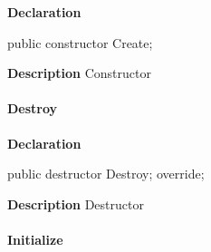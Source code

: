 \documentclass{report}
\newif\ifpdf
\begin{document}
\label{ipkhandle.TInstallation-Create}
\begin{list}{}{
\setlength{\itemindent}{0cm}
\setlength{\listparindent}{0cm}
\setlength{\leftmargin}{\evensidemargin}
\addtolength{\leftmargin}{\tmplength}
\settowidth{\labelsep}{X}
\addtolength{\leftmargin}{\labelsep}
\setlength{\labelwidth}{\tmplength}
}
\item[\textbf{Declaration}\hfill]
\ifpdf
\begin{flushleft}
\fi
\begin{ttfamily}
public constructor Create;\end{ttfamily}

\ifpdf
\end{flushleft}
\fi

\par
\item[\textbf{Description}]
Constructor

\end{list}
\paragraph*{Destroy}\hspace*{\fill}

\label{ipkhandle.TInstallation-Destroy}
\begin{list}{}{
\setlength{\itemindent}{0cm}
\setlength{\listparindent}{0cm}
\setlength{\leftmargin}{\evensidemargin}
\addtolength{\leftmargin}{\tmplength}
\settowidth{\labelsep}{X}
\addtolength{\leftmargin}{\labelsep}
\setlength{\labelwidth}{\tmplength}
}
\item[\textbf{Declaration}\hfill]
\ifpdf
\begin{flushleft}
\fi
\begin{ttfamily}
public destructor Destroy; override;\end{ttfamily}

\ifpdf
\end{flushleft}
\fi

\par
\item[\textbf{Description}]
Destructor

\end{list}
\paragraph*{Initialize}\hspace*{\fill}
\end{document}
